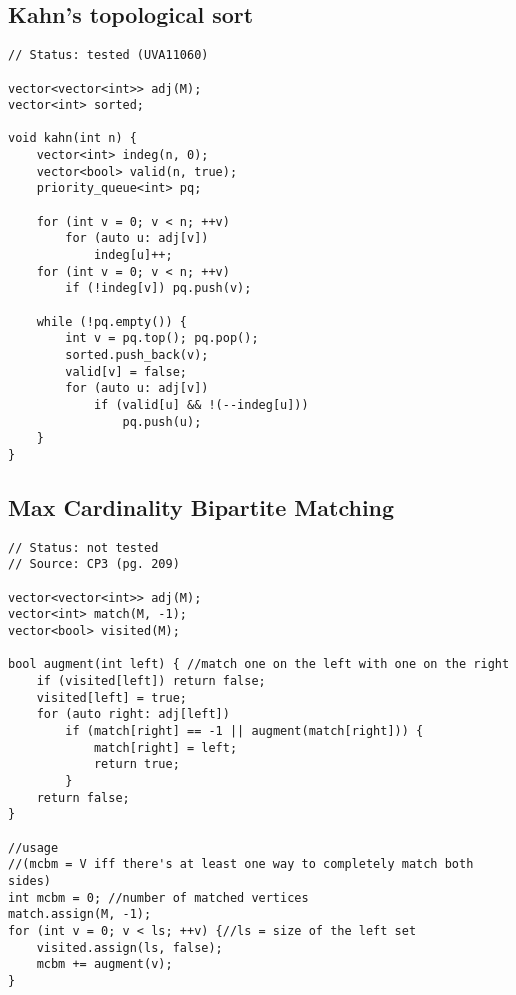 \documentclass[12pt, a4paper, twoside]{article}
\begin{document}
\subsection{Kahn's topological sort}
\begin{lstlisting}
// Status: tested (UVA11060)

vector<vector<int>> adj(M);
vector<int> sorted;

void kahn(int n) {
	vector<int> indeg(n, 0);
	vector<bool> valid(n, true);
	priority_queue<int> pq;

	for (int v = 0; v < n; ++v)
		for (auto u: adj[v])
			indeg[u]++;
	for (int v = 0; v < n; ++v)
		if (!indeg[v]) pq.push(v);

	while (!pq.empty()) {
		int v = pq.top(); pq.pop();
		sorted.push_back(v);
		valid[v] = false;
		for (auto u: adj[v])
			if (valid[u] && !(--indeg[u]))
				pq.push(u);
	}
}
\end{lstlisting}

\subsection{Max Cardinality Bipartite Matching}
\begin{lstlisting}
// Status: not tested
// Source: CP3 (pg. 209)

vector<vector<int>> adj(M);
vector<int> match(M, -1);
vector<bool> visited(M);

bool augment(int left) { //match one on the left with one on the right
	if (visited[left]) return false;
	visited[left] = true;
	for (auto right: adj[left])
		if (match[right] == -1 || augment(match[right])) {
			match[right] = left;
			return true;
		}
	return false;
}

//usage
//(mcbm = V iff there's at least one way to completely match both sides)
int mcbm = 0; //number of matched vertices
match.assign(M, -1);
for (int v = 0; v < ls; ++v) {//ls = size of the left set
	visited.assign(ls, false);
	mcbm += augment(v);
}
\end{lstlisting}
\end{document}
